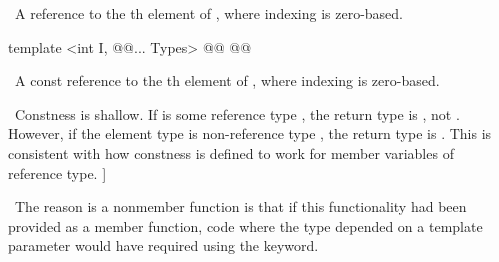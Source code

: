 \documentclass[american,twoside]{book}
\begin{document}
\begin{itemdescr}
\pnum
{}

\pnum
{}

\pnum
\returns\  A reference to the th element of , where
indexing is zero-based.
\end{itemdescr}

%
%
\begin{itemdecl}
template <int I, @@... Types> 
  @@
  @@
\end{itemdecl}

\begin{itemdescr}
\pnum
{}

\pnum
{}

\pnum
\returns\  A const reference to the th element of , where
indexing is zero-based.

\pnum
\enternote\ Constness is shallow. If  is some
reference type , the return type is , not .
However, if the element type is non-reference type , the return
type is .
This is consistent with how constness is defined to work 
for member variables of reference type. \exitnote]

\pnum
\enternote\ The reason  is a
nonmember function is that if this functionality had been
provided as a member function, code where the type
depended on a template parameter would have required using
the  keyword. \exitnote\
\end{itemdescr}
\end{document}
